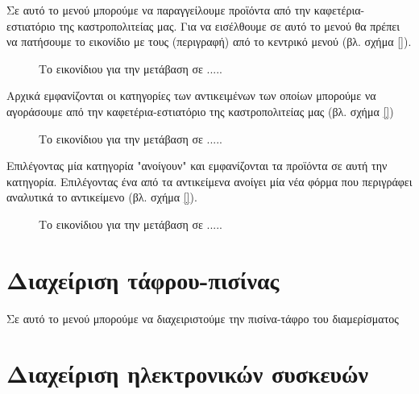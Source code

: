 \documentclass[a4paper,titlepage,twoside,12pt,leqno]{article}
\begin{document}
Σε αυτό το μενού μπορούμε να παραγγείλουμε προϊόντα από την καφετέρια-εστιατόριο της καστροπολιτείας μας. Για να εισέλθουμε σε αυτό το μενού θα πρέπει να πατήσουμε το εικονίδιο με τους (περιγραφή) από το κεντρικό μενού (βλ. σχήμα \ref{}).

\begin{figure}
\begin{center}
\resizebox*{10.5cm}{!}{
\rule{0.4\textwidth}{0.3\textwidth}}
\caption{Το εικονίδιου για την μετάβαση σε .....}
\label{fig:icon:}
\end{center}
\end{figure}

Αρχικά εμφανίζονται οι κατηγορίες των αντικειμένων των οποίων μπορούμε να αγοράσουμε από την καφετέρια-εστιατόριο της καστροπολιτείας μας (βλ. σχήμα \ref{})

\begin{figure}
\begin{center}
\resizebox*{10.5cm}{!}{
\rule{0.4\textwidth}{0.3\textwidth}}
\caption{Το εικονίδιου για την μετάβαση σε .....}
\label{fig:icon:}
\end{center}
\end{figure}

Επιλέγοντας μία κατηγορία "ανοίγουν" και εμφανίζονται τα προϊόντα σε αυτή την κατηγορία. Επιλέγοντας ένα από τα αντικείμενα ανοίγει μία νέα φόρμα που περιγράφει αναλυτικά το αντικείμενο (βλ. σχήμα \ref{}).

\begin{figure}
\begin{center}
\resizebox*{10.5cm}{!}{
\rule{0.4\textwidth}{0.3\textwidth}}
\caption{Το εικονίδιου για την μετάβαση σε .....}
\label{fig:icon:}
\end{center}
\end{figure}

\section{Διαχείριση τάφρου-πισίνας}
\label{pisina}

Σε αυτό το μενού μπορούμε να διαχειριστούμε την πισίνα-τάφρο του διαμερίσματος

\section{Διαχείριση ηλεκτρονικών συσκευών}
\label{syskeuves}
\end{document}
